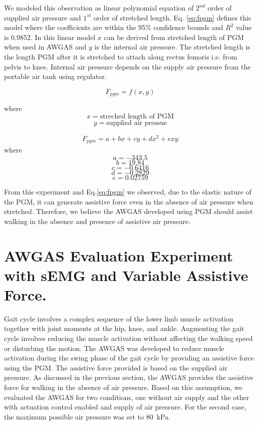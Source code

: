 \documentclass[paper,JRM,paper]{jaciiiarticle}
\begin{document}
We modeled this observation as linear polynomial equation of $2^{nd}$ order of supplied air pressure and $1^{st}$ order of stretched length. Eq. \ref{eq:fpgm} defines this model where the coefficients are within the 95\% confidence bounds and $R^{2}$ value is 0.9852. In this linear model $x$ can be derived from stretched length of PGM when used in AWGAS and $y$ is the internal air pressure. The stretched length is the length PGM after it is stretched to attach along rectus femoris i.e. from pelvis to knee. Internal air pressure depends on the supply air pressure from the portable air tank using regulator. 

\[F_{pgm} = f(x,y)\]

where
\[x = \text{streched length of PGM}\] 
\[y = \text{supplied air pressue}\]

\begin{align}\label{eq:fpgm}
	F_{pgm} = a +bx+cy+dx^2+exy
\end{align}
where
\[a = -343.5\]
\[b=19.84\]
\[c = -0.6416\]
\[d = -0.2829\]
\[e = 0.02759\]

From this experiment and Eq.\ref{eq:fpgm} we observed, due to the elastic nature of the PGM, it can generate assistive force even in the absence of air pressure when stretched. Therefore, we believe the AWGAS developed using PGM should assist walking in the absence and presence of assistive air pressure.



\section{AWGAS Evaluation Experiment with sEMG and Variable Assistive Force.}\label{evaluation}

Gait cycle involves a complex sequence of the lower limb muscle activation together with joint moments at the hip, knee, and ankle. Augmenting the gait cycle involves reducing the muscle activation without affecting the walking speed or disturbing the motion. The AWGAS was developed to reduce muscle activation during the swing phase of the gait cycle by providing an assistive force using the PGM. The assistive force provided is based on the supplied air pressure. As discussed in the previous section, the AWGAS provides the assistive force for walking in the absence of air pressure. Based on this assumption, we evaluated the AWGAS for two conditions, one without air supply and the other with actuation control enabled and supply of air pressure. For the second case, the maximum possible air pressure was set to \SI{80}{\kilo\pascal}.
\end{document}
